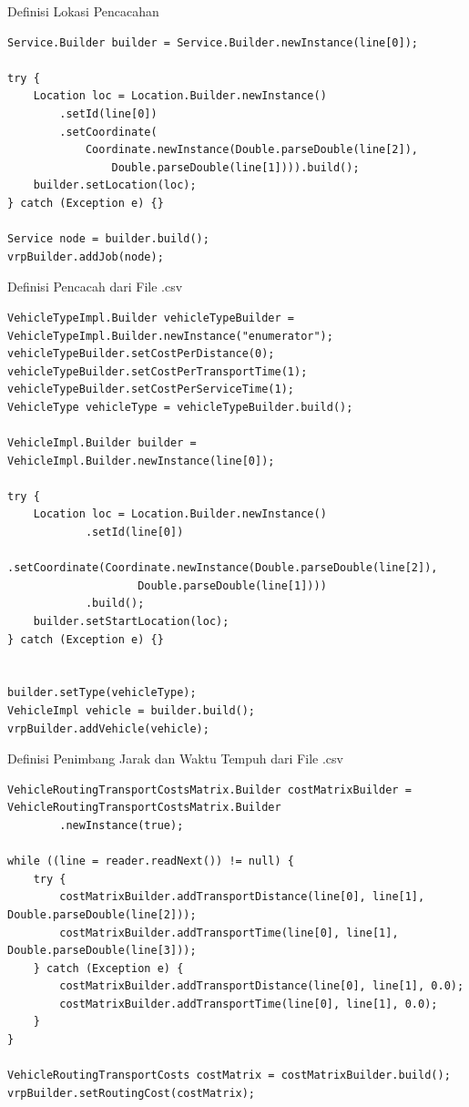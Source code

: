 \begin{listing}
	\caption{Definisi Lokasi Pencacahan}
	\label{lst:jsprit_define_locations}
	\begin{verbatim}
Service.Builder builder = Service.Builder.newInstance(line[0]);

try {
    Location loc = Location.Builder.newInstance()
        .setId(line[0])
        .setCoordinate(
            Coordinate.newInstance(Double.parseDouble(line[2]), 
                Double.parseDouble(line[1]))).build();
    builder.setLocation(loc);
} catch (Exception e) {}

Service node = builder.build();
vrpBuilder.addJob(node);
	\end{verbatim}
\end{listing}


\begin{listing}
	\caption{Definisi Pencacah dari File .csv}
	\label{lst:jsprit_define_enumerators}
	\begin{verbatim}
VehicleTypeImpl.Builder vehicleTypeBuilder = VehicleTypeImpl.Builder.newInstance("enumerator");
vehicleTypeBuilder.setCostPerDistance(0);
vehicleTypeBuilder.setCostPerTransportTime(1);
vehicleTypeBuilder.setCostPerServiceTime(1);
VehicleType vehicleType = vehicleTypeBuilder.build();

VehicleImpl.Builder builder = VehicleImpl.Builder.newInstance(line[0]);

try {
    Location loc = Location.Builder.newInstance()
            .setId(line[0])
            .setCoordinate(Coordinate.newInstance(Double.parseDouble(line[2]),
                    Double.parseDouble(line[1])))
            .build();
    builder.setStartLocation(loc);
} catch (Exception e) {}


builder.setType(vehicleType);
VehicleImpl vehicle = builder.build();
vrpBuilder.addVehicle(vehicle);
	\end{verbatim}
\end{listing}


\begin{listing}
	\caption{Definisi Penimbang Jarak dan Waktu Tempuh dari File .csv}
	\label{lst:jsprit_define_route_weights}
	\begin{verbatim}
VehicleRoutingTransportCostsMatrix.Builder costMatrixBuilder = VehicleRoutingTransportCostsMatrix.Builder
        .newInstance(true);

while ((line = reader.readNext()) != null) {
    try {
        costMatrixBuilder.addTransportDistance(line[0], line[1], Double.parseDouble(line[2]));
        costMatrixBuilder.addTransportTime(line[0], line[1], Double.parseDouble(line[3]));
    } catch (Exception e) {
        costMatrixBuilder.addTransportDistance(line[0], line[1], 0.0);
        costMatrixBuilder.addTransportTime(line[0], line[1], 0.0);
    }
}

VehicleRoutingTransportCosts costMatrix = costMatrixBuilder.build();
vrpBuilder.setRoutingCost(costMatrix);
	\end{verbatim}
\end{listing}


